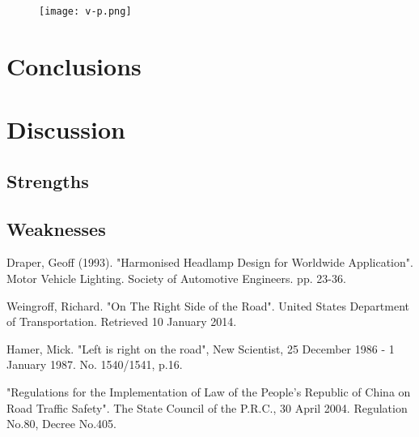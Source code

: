 \begin{figure}[h]
\small
\texttt{[image: v-p.png]}
\end{figure}



\section{Conclusions}




\section{Discussion}

\subsection{Strengths}
	
\subsection{Weaknesses}




\begin{thebibliography}{99}

 Draper, Geoff (1993). "Harmonised 
Headlamp Design for Worldwide Application". Motor Vehicle 
Lighting. Society of Automotive Engineers. pp. 23-36.

 Weingroff, Richard. "On The 
Right Side of the Road". United States Department of 
Transportation. Retrieved 10 January 2014.

 Hamer, Mick. "Left is right on the 
road", New Scientist, 25 December 1986 - 1 January 1987. No.
1540/1541, p.16.

 "Regulations for the Implementation of Law of the People's Republic of China on 
Road Traffic Safety". The State Council of the P.R.C., 30 
April 2004. Regulation No.80, Decree No.405.

\end{thebibliography}
